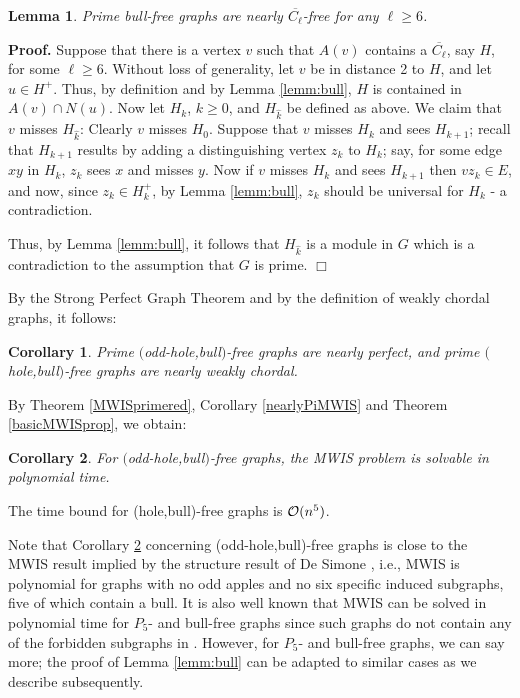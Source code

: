 \documentclass[11pt]{article}
\newcommand{\qed}{\hfill $\Box$}
\newcommand{\0}{\text{ has a co-join to }}
\newcommand{\1}{\text{ has a join to }}
\newtheorem{lemm}{Lemma}
\newtheorem{coro}{Corollary}
\begin{document}
\begin{lemm}\label{lemm:bullnearlycoCkfr}
Prime bull-free graphs are nearly $\overline{C_\ell}$-free for any $\ell \ge 6$.
\end{lemm}

\noindent 
{\bf Proof.} Suppose that there is a vertex $v$ such that $A(v)$ contains a $\overline{C_\ell}$, say $H$, for some $\ell \ge 6$. Without loss of generality, let $v$ be in distance 2 to $H$, and let $u \in H^+$. Thus, by definition and by Lemma \ref{lemm:bull}, $H$ is contained in $A(v) \cap N(u)$. Now let $H_k$, $k \ge 0$, and $H_{\hat{k}}$ be defined as above. We claim that $v$ misses $H_{\hat{k}}$: Clearly $v$ misses $H_0$. Suppose that $v$ misses $H_k$ and sees $H_{k+1}$; recall that $H_{k+1}$ results by adding a distinguishing vertex $z_k$ to $H_k$; say, for some edge $xy$ in $H_k$, $z_k$ sees $x$ and misses $y$. Now if $v$ misses $H_k$ and sees $H_{k+1}$ then $vz_k \in E$, and now, since $z_k \in H_k^+$, by Lemma \ref{lemm:bull}, $z_k$ should be universal for $H_k$ - a contradiction.     

Thus, by Lemma \ref{lemm:bull}, it follows that $H_{\hat{k}}$ is a module in $G$ which is a contradiction to the assumption that $G$ is prime.   
\qed

\medskip

By the Strong Perfect Graph Theorem and by the definition of weakly chordal graphs, it follows:

\begin{coro}\label{holebullfrnearlywc}
Prime $($odd-hole,bull$)$-free graphs are nearly perfect, and prime $($hole,bull$)$-free graphs are nearly weakly chordal.
\end{coro}

By Theorem \ref{MWISprimered}, Corollary \ref{nearlyPiMWIS} and Theorem \ref{basicMWISprop}, we obtain: 

\begin{coro}\label{holebullfrMWIS}
For $($odd-hole,bull$)$-free graphs, the MWIS problem is solvable in polynomial time. 
\end{coro}

The time bound for (hole,bull)-free graphs is ${\cal O}(n^5)$.

\medskip

Note that Corollary \ref{holebullfrMWIS} concerning (odd-hole,bull)-free graphs is close to the MWIS result implied by the structure result of De Simone \cite{DeSim1993}, i.e., MWIS is polynomial for graphs with no odd apples and no six specific induced subgraphs, five of which contain a bull. It is also well known that MWIS can be solved in polynomial time for $P_5$- and bull-free graphs since such graphs do not contain any of the forbidden subgraphs in \cite{DeSim1993}.
However, for $P_5$- and bull-free graphs, we can say more; the proof of Lemma \ref{lemm:bull} can be adapted to similar cases as we describe subsequently.   
\end{document}
